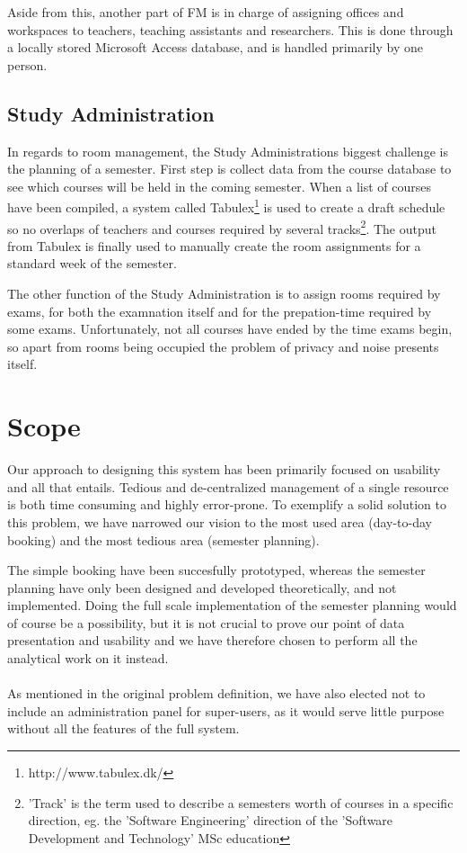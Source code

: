 Aside from this, another part of FM is in charge of assigning offices and workspaces to teachers, teaching assistants and researchers. This is done through a locally stored Microsoft Access database, and is handled primarily by one person.

\subsection{Study Administration}
In regards to room management, the Study Administrations biggest challenge is the planning of a semester. First step is collect data from the course database to see which courses will be held in the coming semester. When a list of courses have been compiled, a system called Tabulex\footnote{http://www.tabulex.dk/} is used to create a draft schedule so no overlaps of teachers and courses required by several tracks\footnote{'Track' is the term used to describe a semesters worth of courses in a specific direction, eg. the 'Software Engineering' direction of the 'Software Development and Technology' MSc education}. The output from Tabulex is finally used to manually create the room assignments for a standard week of the semester.

The other function of the Study Administration is to assign rooms required by exams, for both the examnation itself and for the prepation-time required by some exams. Unfortunately, not all courses have ended by the time exams begin, so apart from rooms being occupied the problem of privacy and noise presents itself.
\\
\section{Scope}
Our approach to designing this system has been primarily focused on usability and all that entails. Tedious and de-centralized management of a single resource is both time consuming and highly error-prone.
To exemplify a solid solution to this problem, we have narrowed our vision to the most used area (day-to-day booking) and the most tedious area (semester planning).

The simple booking have been succesfully prototyped, whereas the semester planning have only been designed and developed theoretically, and not implemented. Doing the full scale implementation of the semester planning would of course be a possibility, but it is not crucial to prove our point of data presentation and usability and we have therefore chosen to perform all the analytical work on it instead.
\\ \\
\noindent As mentioned in the original problem definition, we have also elected not to include an administration panel for super-users, as it would serve little purpose without all the features of the full system.

